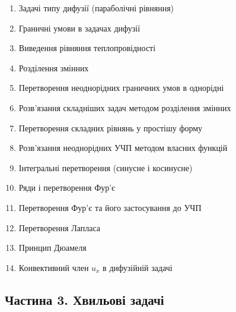 \begin{enumerate}
\def\labelenumi{\arabic{enumi}.}
\setcounter{enumi}{1}
\tightlist
\item
  Задачі типу дифузії (параболічні рівняння)
\item
  Граничні умови в задачах дифузії
\item
  Виведення рівняння теплопровідності
\item
  Розділення змінних
\item
  Перетворення неоднорідних граничних умов в однорідні
\item
  Розв'язання складніших задач методом розділення змінних
\item
  Перетворення складних рівнянь у простішу форму
\item
  Розв'язання неоднорідних УЧП методом власних функцій
\item
  Інтегральні перетворення (синусне і косинусне)
\item
  Ряди і перетворення Фур'є
\item
  Перетворення Фур'є та його застосування до УЧП
\item
  Перетворення Лапласа
\item
  Принцип Дюамеля
\item
  Конвективний член \(u_x\) в дифузійній задачі
\end{enumerate}

\subsection{Частина 3. Хвильові задачі}\label{ux447ux430ux441ux442ux438ux43dux430-3.-ux445ux432ux438ux43bux44cux43eux432ux456-ux437ux430ux434ux430ux447ux456}

